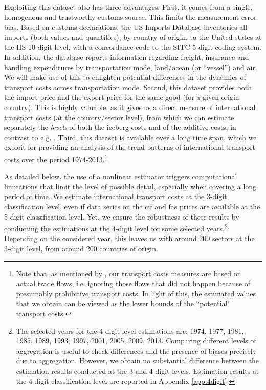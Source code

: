 \documentclass[a4paper,11pt]{article}
\begin{document}
Exploiting this dataset also has three advantages.
First, it comes from a single, homogenous and trustworthy customs source.
This limits the measurement error bias.
Based on customs declarations, the US Imports Database inventories all imports (both values and quantities), by country of origin, to the United states at the HS 10-digit level, with a concordance code to the SITC 5-digit coding system.
In addition, the database reports information regarding freight, insurance and handling expenditures by transportation mode, land/ocean (or ``vessel'') and air.
We will make use of this to enlighten potential differences in the dynamics of transport costs across transportation mode.
Second, this dataset provides both the import price and the export price for the same good (for a given origin country).
This is highly valuable, as it gives us a direct measure of international transport costs (at the country/sector level), from which we can estimate separately the \textit{levels} of both the iceberg costs and of the additive costs, in contrast to e.g. \cite{Irrazabal_2015}.
Third, this dataset is available over a long time span, which we exploit for providing an analysis of the trend patterns of international transport costs over the period 1974-2013.\footnote{Note that, as mentioned by \cite{Lafourcade_Thisse}, our transport costs measures are based on actual trade flows, i.e.
ignoring those flows that did not happen because of presumably prohibitive transport costs.
In light of this, the estimated values that we obtain can be viewed as the lower bounds of the ``potential'' transport costs.} \smallskip


As detailed below, the use of a nonlinear estimator triggers computational limitations that limit the level of possible detail, especially when covering a long period of time.
We estimate international transport costs at the 3-digit classification level, even if data series on the cif and fas prices are available at the 5-digit classification level.
Yet, we ensure the robustness of these results by conducting the estimations at the 4-digit level for some selected years.\footnote{The selected years for the 4-digit level estimations are: 1974, 1977, 1981, 1985, 1989, 1993, 1997, 2001, 2005, 2009, 2013.
Comparing different levels of aggregation is useful to check differences and the presence of biases precisely due to aggregation.
However, we obtain no substantial difference between the estimation results conducted at the 3 and 4-digit levels.
Estimation results at the 4-digit classification level are reported in Appendix \ref{app:4digit}.} Depending on the considered year, this leaves us with around 200 sectors at the 3-digit level, from around 200 countries of origin.
\end{document}
